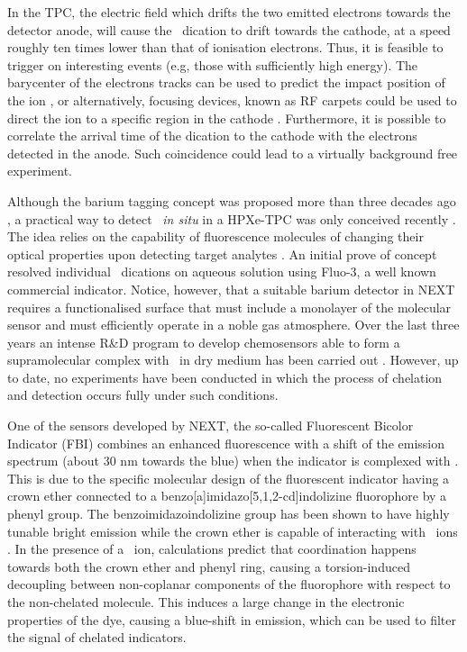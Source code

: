 \documentclass[aps,prl,reprint,longbibliography,superscriptaddress, english]{revtex4-1}
\begin{document}
In the TPC, the electric field which drifts the two emitted electrons towards the detector anode, will cause the \Bapp\ dication to drift towards the cathode, at a speed roughly ten times lower than that of ionisation electrons. Thus, it is feasible to trigger on interesting events (e.g, those with sufficiently high energy). The barycenter of the electrons tracks can be used to predict the impact position of the ion \cite{rivilla_fluorescent_2020}, or alternatively, focusing devices, known as RF carpets could be used to direct the ion to a specific region in the cathode \cite{NEXT:2021idl}. Furthermore, it is possible to correlate the arrival time of the dication to the cathode with the electrons detected in the anode.
Such coincidence could lead to a virtually background free experiment. 


Although the barium tagging concept was proposed more than three decades ago \cite{Moe:1991ik}, a practical way to detect \Bapp\ {\it in situ} in a HPXe-TPC was only conceived recently \cite{Nygren_2015, Jones:2016qiq}. The idea relies on the capability of fluorescence molecules of changing their optical properties upon detecting target analytes \cite{valeur_chemical,wolfbeis_materials_2005}. An initial prove of concept \cite{McDonald:2017izm} resolved individual \Bapp\ dications on aqueous solution using Fluo-3, a well known commercial indicator. Notice, however, that a suitable barium detector in NEXT requires a functionalised surface that must include a monolayer of the molecular sensor and must efficiently operate in a noble gas atmosphere. Over the last three years an intense R\&D program to develop chemosensors able to form a supramolecular complex with \Bapp\ in dry medium has been carried out \cite{Thapa:2019zjk, rivilla_fluorescent_2020,thapa_demonstration_2021}. However, up to date, no experiments have been conducted in which the process of chelation and detection occurs fully under such conditions.

One of the sensors developed by NEXT, the so-called
Fluorescent Bicolor Indicator (FBI) \cite{rivilla_fluorescent_2020} combines an enhanced fluorescence with a shift of the emission spectrum (about 30 nm towards the blue) when the indicator is complexed with \Bapp.  This is due to the specific molecular design of the fluorescent indicator having a crown ether connected to a benzo[a]imidazo[5,1,2-cd]indolizine fluorophore by a phenyl group. The benzoimidazoindolizine group has been shown to have highly tunable bright emission\cite{Stasyuk_benzo,Levesque_general} while the crown ether is capable of interacting with \Bapp\ ions \cite{valeur_chemical,maleknia_cavity-size-dependent_2002}. In the presence of a \Bapp\ ion, calculations predict that coordination happens towards both the crown ether and phenyl ring, causing a  {torsion-induced decoupling between non-coplanar components of the fluorophore with respect} to the non-chelated molecule. This induces a large change in the electronic properties of the dye, causing a blue-shift in emission, which can be used to filter the signal of chelated indicators.
\end{document}
